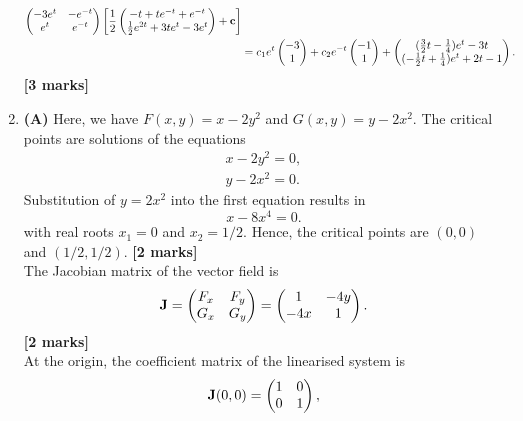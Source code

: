 \documentclass[11pt,a4paper]{article}
\begin{document}
\begin{enumerate}
\begin{align*}
			\begin{pmatrix}
				-3e^t & -e^{-t}\\
				e^t & e^{-t}
			\end{pmatrix}
			\left[
				\frac{1}{2}
				\begin{pmatrix}
					-t+te^{-t}+e^{-t}\\
					\frac{1}{2}e^{2t} + 3te^t - 3e^t
				\end{pmatrix} + \vb{c}
			\right]\\
			&= c_1e^t
			\begin{pmatrix}
				-3\\
				1
			\end{pmatrix} + c_2e^{-t}
			\begin{pmatrix}
				-1\\
				1
			\end{pmatrix} +
			\begin{pmatrix}
				(\frac{3}{2}t - \frac{1}{4})e^t - 3t\\
				(-\frac{1}{2}t + \frac{1}{4})e^t + 2t - 1
			\end{pmatrix}.
		\end{align*}
		\hfill\textbf{[3 marks]}
		\item \textbf{(A)} Here, we have $F(x, y) = x − 2y^2$ and $G(x, y) = y − 2x^2$. The critical points are solutions of the equations
		\begin{align*}
			x-2y^2 = 0,\\
			y - 2x^2 = 0.
		\end{align*}
		Substitution of $y = 2x^2$ into the first equation results in
		$$
		x - 8x^4 = 0.
		$$
		with real roots $x_1 = 0$ and $x_2 = 1/2$. Hence, the critical points are $(0, 0)$ and $(1/2, 1/2)$.
		\hspace*{0pt}\hfill\textbf{[2 marks]}\\
		The Jacobian matrix of the vector field is
		$$
		\vb{J} =
		\begin{pmatrix}
			F_x & F_y\\
			G_x & G_y
		\end{pmatrix} =
		\begin{pmatrix}
			1 & -4y\\
			-4x & 1
		\end{pmatrix}.
		$$
		\hfill\textbf{[2 marks]}\\
		At the origin, the coefficient matrix of the linearised system is
		$$
		\vb{J}(0, 0)=
		\begin{pmatrix}
			1 & 0\\
			0 & 1
		\end{pmatrix},
$$
\end{enumerate}
\end{document}
